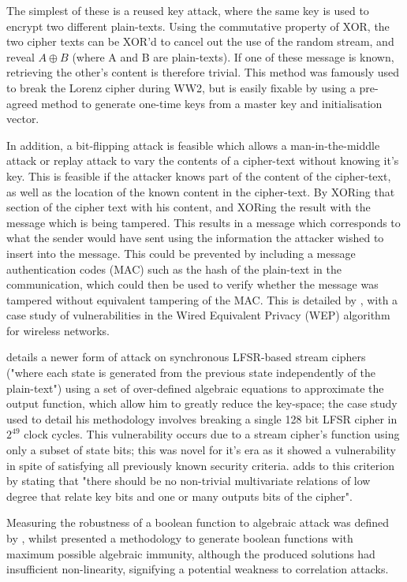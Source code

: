 \documentclass[british,11pt,a4paper]{article}
\begin{document}
The simplest of these is a reused key attack, where the same key is used to encrypt two different plain-texts. Using the commutative property of XOR, the two cipher texts can be XOR'd to cancel out the use of the random stream, and reveal \(A \oplus B\) (where A and B are plain-texts). If one of these message is known, retrieving the other's content is therefore trivial. This method was famously used to break the Lorenz cipher during WW2, but is easily fixable by using a pre-agreed method to generate one-time keys from a master key and initialisation vector. 

In addition, a bit-flipping attack is feasible which allows a man-in-the-middle attack or replay attack to vary the contents of a cipher-text without knowing it's key. This is feasible if the attacker knows part of the content of the cipher-text, as well as the location of the known content in the cipher-text. By XORing that section of the cipher text with his content, and XORing the result with the message which is being tampered. This results in a message which corresponds to what the sender would have sent using the information the attacker wished to insert into the message. This could be prevented by including a message authentication codes (MAC) such as the hash of the plain-text in the communication, which could then be used to verify whether the message was tampered without equivalent tampering of the MAC. This is detailed by \citet{Isaacs}, with a case study of vulnerabilities in the Wired Equivalent Privacy (WEP) algorithm for wireless networks.

\citet{courtois} details a newer form of attack on synchronous LFSR-based stream ciphers ("where each state is generated from the previous state independently of the plain-text") using a set of over-defined algebraic equations to approximate the output function, which allow him to greatly reduce the key-space; the case study used to detail his methodology involves breaking a single 128 bit LFSR cipher in \(2^{49}\) clock cycles. This vulnerability occurs due to a stream cipher's function using only a subset of state bits; this was novel for it's era as it showed a vulnerability in spite of satisfying all previously known security criteria. \citeauthor{courtois} adds to this criterion by stating that "there should be no non-trivial multivariate relations of low degree that relate key bits and one or many outputs bits of the cipher". 

Measuring the robustness of a boolean function to algebraic attack was defined by \citet{Armknecht2006-sj}, whilst \citet{carlet} presented a methodology to generate boolean functions with maximum possible algebraic immunity, although the produced solutions had insufficient non-linearity, signifying a potential weakness to correlation attacks.
\end{document}
